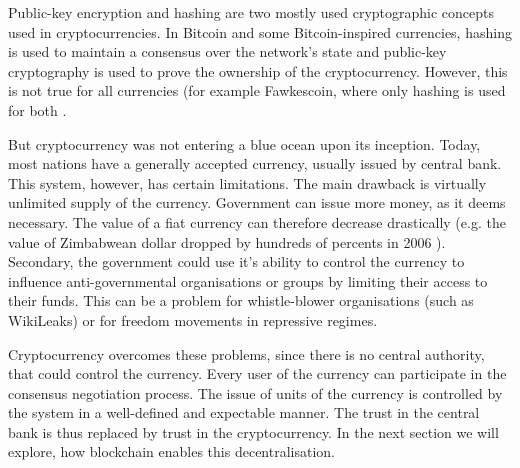 Public-key encryption and hashing are two mostly used cryptographic concepts used in cryptocurrencies. In Bitcoin and some Bitcoin-inspired currencies, hashing is used to maintain a consensus over the network's state and public-key cryptography is used to prove the ownership of the cryptocurrency. However, this is not true for all currencies (for example Fawkescoin, where only hashing is used for both \cite{Bonneau2014FawkescoinCryptography}.

But cryptocurrency was not entering a blue ocean upon its inception. Today, most nations have a generally accepted currency, usually issued by central bank. This system, however, has certain limitations. The main drawback is virtually unlimited supply of the currency. Government can issue more money, as it deems necessary. The value of a fiat currency can therefore decrease drastically (e.g. the value of Zimbabwean dollar dropped by hundreds of percents in 2006 \footnotemark ). Secondary, the government could use it's ability to control the currency to influence anti-governmental organisations or groups by limiting their access to their funds. This can be a problem for whistle-blower organisations (such as WikiLeaks) or for freedom movements in repressive regimes.
% 

Cryptocurrency overcomes these problems, since there is no central authority, that could control the currency. Every user of the currency can participate in the consensus negotiation process. The issue of units of the currency is controlled by the system in a well-defined and expectable manner. The trust in the central bank is thus replaced by trust in the cryptocurrency. In the next section we will explore, how blockchain enables this decentralisation.